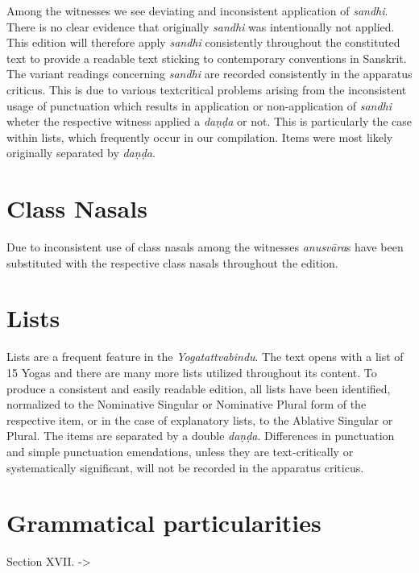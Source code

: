 {Among the witnesses we see deviating and inconsistent application of \textit{sandhi}. There is no clear evidence that originally \textit{sandhi} was intentionally not applied. This edition will therefore apply \textit{sandhi} consistently throughout the constituted text to provide a readable text sticking to contemporary conventions in Sanskrit. The variant readings concerning \textit{sandhi} are recorded consistently in the apparatus criticus. This is due to various textcritical problems arising from the inconsistent usage of punctuation which results in application or non-application of \textit{sandhi} wheter the respective witness applied a \textit{daṇḍa} or not. This is particularly the case within lists, which frequently occur in our compilation. Items were most likely originally separated by \textit{daṇḍa}. 


\section{Class Nasals}

Due to inconsistent use of class nasals among the witnesses \textit{anusvāra}s have been substituted with the respective class nasals throughout the edition.

\section{Lists}

Lists are a frequent feature in the \textit{Yogatattvabindu}. The text opens with a list of 15 Yogas and there are many more lists utilized throughout its content. To produce a consistent and easily readable edition, all lists have been identified, normalized to the Nominative Singular or Nominative Plural form of the respective item, or in the case of explanatory lists, to the Ablative Singular or Plural. The items are separated by a double \textit{daṇḍa}. Differences in punctuation and simple punctuation emendations, unless they are text-critically or systematically significant, will not be recorded in the apparatus criticus.
\clearpage

\section{Grammatical particularities}

Section XVII. ->

}
